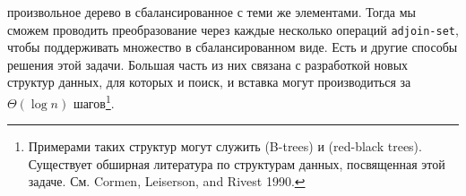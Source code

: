 произвольное дерево в сбалансированное с теми же элементами.  Тогда мы 
сможем проводить преобразование через каждые несколько операций
{\tt adjoin-set}, чтобы поддерживать множество в
сбалансированном виде.
Есть и другие способы решения этой задачи. Большая часть из них
связана с разработкой новых структур данных, для которых и поиск, и
вставка могут производиться за $\Theta (\log n)$ 
шагов\footnote{Примерами таких структур могут служить 
%
%
 (B-trees) и 
 (red-black trees).  Существует обширная литература
по структурам данных, посвященная этой задаче. См. Cormen, Leiserson, and Rivest 1990.
%
%
}.

\begin{cntrfig}

\caption{Несбалансированное дерево, порожденное
последовательным присоединением элементов от 1 до 7.}
\label{P2.17}

\end{cntrfig}

